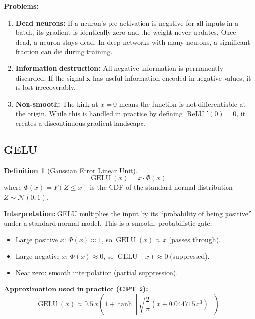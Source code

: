 \documentclass[11pt, a4paper]{article}
\theoremstyle{definition}
\newtheorem{definition}{Definition}[section]
\newcommand{\vx}{\bm{x}}
\DeclareMathOperator{\ReLU}{ReLU}
\DeclareMathOperator{\GELU}{GELU}
\begin{document}
\textbf{Problems:}
\begin{enumerate}
    \item \textbf{Dead neurons:} If a neuron's pre-activation is negative for all inputs in a batch, its gradient is identically zero and the weight never updates. Once dead, a neuron stays dead. In deep networks with many neurons, a significant fraction can die during training.
    
    \item \textbf{Information destruction:} All negative information is permanently discarded. If the signal $\vx$ has useful information encoded in negative values, it is lost irrecoverably.
    
    \item \textbf{Non-smooth:} The kink at $x=0$ means the function is not differentiable at the origin. While this is handled in practice by defining $\ReLU'(0) = 0$, it creates a discontinuous gradient landscape.
\end{enumerate}

\subsection{GELU}

\begin{definition}[Gaussian Error Linear Unit]
\begin{equation}\label{eq:gelu}
    \GELU(x) = x \cdot \Phi(x)
\end{equation}
where $\Phi(x) = P(Z \leq x)$ is the CDF of the standard normal distribution $Z \sim \mathcal{N}(0,1)$.
\end{definition}

\textbf{Interpretation:} GELU multiplies the input by its ``probability of being positive'' under a standard normal model. This is a smooth, probabilistic gate:
\begin{itemize}[nosep]
    \item Large positive $x$: $\Phi(x) \approx 1$, so $\GELU(x) \approx x$ (passes through).
    \item Large negative $x$: $\Phi(x) \approx 0$, so $\GELU(x) \approx 0$ (suppressed).
    \item Near zero: smooth interpolation (partial suppression).
\end{itemize}

\textbf{Approximation used in practice (GPT-2):}
\begin{equation}
    \GELU(x) \approx 0.5 \, x \left(1 + \tanh\left[\sqrt{\frac{2}{\pi}}\left(x + 0.044715\, x^3\right)\right]\right)
\end{equation}
\end{document}
